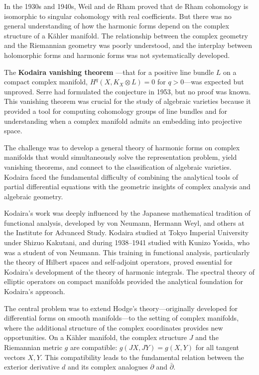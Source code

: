 In the 1930s and 1940s, Weil and de Rham proved that de Rham
cohomology is isomorphic to singular cohomology with real coefficients.
But there was no general understanding of how the harmonic forms depend
on the complex structure of a K{\"a}hler manifold. The relationship
between the complex geometry and the Riemannian geometry was poorly
understood, and the interplay between holomorphic forms and harmonic
forms was not systematically developed.

The \textbf{Kodaira vanishing theorem} \cite{kodaira1964}---that for a positive line
bundle $L$ on a compact complex manifold, $H^q(X, K_X \otimes L) = 0$
for $q > 0$---was expected but unproved. Serre had formulated the
conjecture in 1953, but no proof was known. This vanishing theorem was
crucial for the study of algebraic varieties because it provided a tool
for computing cohomology groups of line bundles and for understanding
when a complex manifold admits an embedding into projective space.

The challenge was to develop a general theory of harmonic forms on
complex manifolds that would simultaneously solve the representation
problem, yield vanishing theorems, and connect to the classification of
algebraic varieties. Kodaira faced the fundamental difficulty of
combining the analytical tools of partial differential equations with
the geometric insights of complex analysis and algebraic geometry.

Kodaira's work was deeply influenced by the Japanese mathematical
tradition of functional analysis, developed by von Neumann, Hermann
Weyl, and others at the Institute for Advanced Study. Kodaira studied at
Tokyo Imperial University under Shizuo Kakutani, and during 1938--1941
studied with Kunizo Yosida, who was a student of von Neumann. This
training in functional analysis, particularly the theory of Hilbert
spaces and self-adjoint operators, proved essential for Kodaira's
development of the theory of harmonic integrals. The spectral theory of
elliptic operators on compact manifolds provided the analytical
foundation for Kodaira's approach.

The central problem was to extend Hodge's theory---originally developed
for differential forms on smooth manifolds---to the setting of complex
manifolds, where the additional structure of the complex coordinates
provides new opportunities. On a K{\"a}hler manifold, the complex
structure $J$ and the Riemannian metric $g$ are compatible:
$g(JX, JY) = g(X, Y)$ for all tangent vectors $X, Y$. This
compatibility leads to the fundamental relation between the exterior
derivative $d$ and its complex analogues $\partial$ and $\bar{\partial}$.

